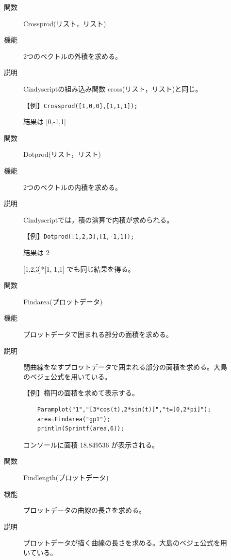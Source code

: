 \documentclass[papersize,a4paper,12pt,uplatex]{jsarticle}
\begin{document}
\begin{description}
\begin{description}
\vspace{\baselineskip}
\hypertarget{crossprod}{}
\item[関数]  Crossprod(リスト，リスト)
\item[機能]  2つのベクトルの外積を求める。
\item[説明]  Cindyscriptの組み込み関数 cross(リスト，リスト)と同じ。

\vspace{\baselineskip}
【例】\verb|Crossprod([1,0,0],[1,1,1]);|
  
      結果は  [0,-1,1]\\

\vspace{\baselineskip}
\hypertarget{dotprod}{}
\item[関数]  Dotprod(リスト，リスト)
\item[機能]  2つのベクトルの内積を求める。
\item[説明]  Cindyscriptでは，積の演算で内積が求められる。

\vspace{\baselineskip}
  【例】\verb|Dotprod([1,2,3],[1,-1,1]);|
  
      結果は  2
      
      [1,2,3]*[1,-1,1] でも同じ結果を得る。

\vspace{\baselineskip}
\hypertarget{findarea}{}
\item[関数]  Findarea(プロットデータ)
\item[機能]  プロットデータで囲まれる部分の面積を求める。
\item[説明]  閉曲線をなすプロットデータで囲まれる部分の面積を求める。大島のベジェ公式を用いている。

\vspace{\baselineskip}
【例】楕円の面積を求めて表示する。
\begin{verbatim}
    Paramplot("1","[3*cos(t),2*sin(t)]","t=[0,2*pi]");
    area=Findarea("gp1");
    println(Sprintf(area,6));
\end{verbatim}

コンソールに面積 18.849536 が表示される。 

\vspace{\baselineskip}
\hypertarget{findlength}{}
\item[関数]  Findlength(プロットデータ)
\item[機能]  プロットデータの曲線の長さを求める。
\item[説明]  プロットデータが描く曲線の長さを求める。大島のベジェ公式を用いている。


\end{description}
\end{description}
\end{document}
